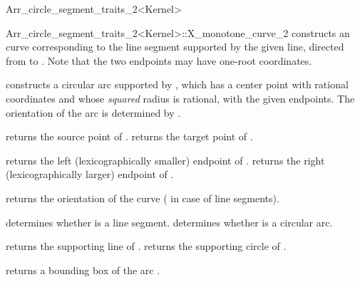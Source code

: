 \begin{ccRefClass}{Arr_circle_segment_traits_2<Kernel>}
\begin{ccClass}{Arr_circle_segment_traits_2<Kernel>::X_monotone_curve_2}
    {constructs an curve corresponding to the line segment supported by
     the given line, directed from  to .
     Note that the two endpoints may have one-root coordinates.
     }

    {constructs a circular arc supported by , which has a
     center point with rational coordinates and whose {\em squared}
     radius is rational, with the given endpoints. The orientation of the
     arc is determined by .
     }

\ccAccessFunctions

  {returns the source point of \ccVar{}.}
\ccGlue
{}
  {returns the target point of \ccVar{}.}

  {returns the left (lexicographically smaller) endpoint of \ccVar{}.}
\ccGlue
{}
  {returns the right (lexicographically larger) endpoint of \ccVar{}.}

  {returns the orientation of the curve ( in case of
   line segments).}

  {determines whether \ccVar{} is a line segment.}
\ccGlue
{}
  {determines whether \ccVar{} is a circular arc.}

  {returns the supporting line of \ccVar{}.
   }
\ccGlue
{}
  {returns the supporting circle of \ccVar{}.
   }

  {returns a bounding box of the arc \ccVar{}.}

\end{ccClass}

\end{ccRefClass}

\ccRefPageEnd
